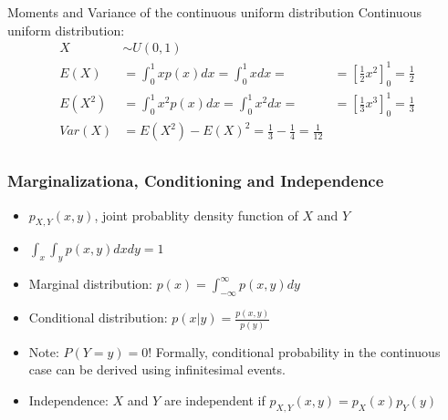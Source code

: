 \begin{bbbox}{Moments and Variance of the continuous uniform distribution}
	Continuous uniform distribution: \\
	\begin{align*}
		X &\sim U(0,1) \\
		E(X) &= \int_0^1 x p(x) dx = \int_0^1 x dx = &= \left[ \frac{1}{2}x^2 \right]_0^1 = \frac{1}{2}\\
		E(X^2) &= \int_0^1 x^2 p(x) dx = \int_0^1 x^2 dx = &= \left[ \frac{1}{3}x^3 \right]_0^1 = \frac{1}{3}\\
		Var(X) &= E(X^2) - E(X)^2 = \frac{1}{3} - \frac{1}{4} = \frac{1}{12}\\
	\end{align*}
\end{bbbox}

\subsubsection{Marginalizationa, Conditioning and Independence}
\begin{itemize}
\item $p_{X,Y}(x,y)$, joint probablity density function of $X$ and $Y$
\item $\int_x \int_y p(x,y)dx dy=1$
\item {Marginal distribution:} $p(x)= \int_{-\infty}^\infty p(x,y) dy$
\item {Conditional distribution:} $p(x|y)= \frac{p(x,y)}{p(y)}$ 
\item Note: $P(Y=y)=0$! Formally, conditional probability in the continuous case can be derived using infinitesimal events.
\item {Independence:} $X$ and $Y$ are independent if $p_{X,Y}(x,y)=p_X(x)p_Y(y)$
\end{itemize}



